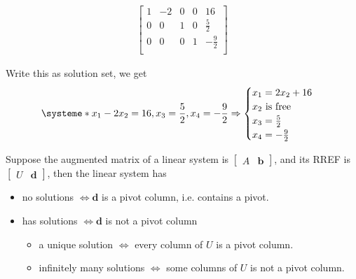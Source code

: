\documentclass{beamer}
\theoremstyle{definition}
\theoremstyle{remark}
\begin{document}
\begin{frame}[t]
\begin{solution}
{\begin{minipage}{\textwidth}
\begin{align*}
\begin{bmatrix}
1&-2&0&0&16\\
0&0&1&0&\frac{5}{2}\\
0&0&0&1&-\frac{9}{2}\\
\end{bmatrix}
\end{align*}
\end{minipage}
}
\pause
\newline\newline\newline
Write this as solution set, we get
\[
\systeme*{x_1-2x_2=16, x_3=\frac{5}{2}, x_4=-\frac{9}{2}}\Rightarrow
\begin{cases}
x_1=2x_2+16\\
x_2\text{ is free}\\
x_3=\frac{5}{2}\\
x_4=-\frac{9}{2}
\end{cases}
\]
\end{solution}
\end{frame}

\begin{frame}[t]
\begin{theorem}\label{14:16-06/03/2022}
Suppose the augmented matrix of a linear system is $\begin{bmatrix}
A&\mathbf b
\end{bmatrix}$, and its RREF is $\begin{bmatrix}
U&\mathbf d
\end{bmatrix}$, then the linear system has
\pause
\begin{itemize}
\item no solutions $\iff \mathbf d$ is a pivot column, i.e. contains a pivot.
\pause
\item has solutions $\iff\mathbf d$ is not a pivot column
\pause
\begin{itemize}
\item a unique solution $\iff$ every column of $U$ is a pivot column.
\pause
\item infinitely many solutions $\iff$ some columns of $U$ is not a pivot column.
\end{itemize}
\end{itemize}
\end{theorem}
\end{frame}
\end{document}
